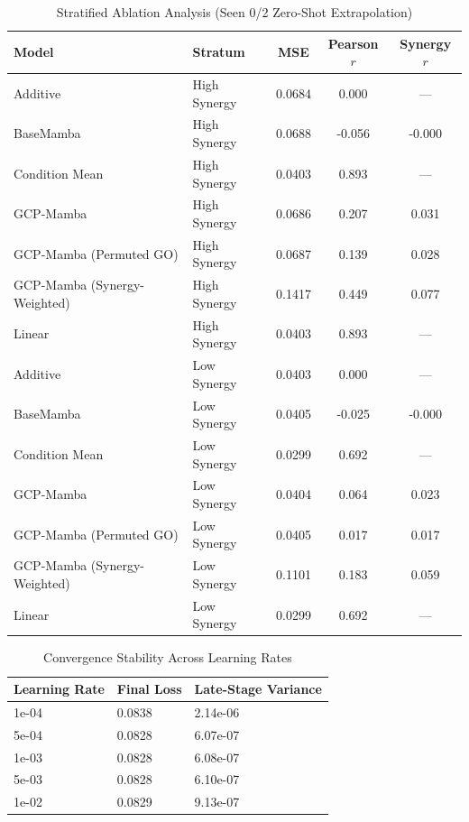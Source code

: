 \documentclass{bioinfo}
\begin{document}
\begin{table}[!htbp]
\centering
\caption{Stratified Ablation Analysis (Seen 0/2 Zero-Shot Extrapolation)}
\label{tab:ablation}
\begin{tabular}{llccc}
\toprule
\textbf{Model} & \textbf{Stratum} & \textbf{MSE} & \textbf{Pearson $r$} & \textbf{Synergy $r$} \\
\midrule
Additive & High Synergy & 0.0684 & 0.000 & --- \\
BaseMamba & High Synergy & 0.0688 & -0.056 & -0.000 \\
Condition Mean & High Synergy & 0.0403 & 0.893 & --- \\
GCP-Mamba & High Synergy & 0.0686 & 0.207 & 0.031 \\
GCP-Mamba (Permuted GO) & High Synergy & 0.0687 & 0.139 & 0.028 \\
GCP-Mamba (Synergy-Weighted) & High Synergy & 0.1417 & 0.449 & 0.077 \\
Linear & High Synergy & 0.0403 & 0.893 & --- \\
Additive & Low Synergy & 0.0403 & 0.000 & --- \\
BaseMamba & Low Synergy & 0.0405 & -0.025 & -0.000 \\
Condition Mean & Low Synergy & 0.0299 & 0.692 & --- \\
GCP-Mamba & Low Synergy & 0.0404 & 0.064 & 0.023 \\
GCP-Mamba (Permuted GO) & Low Synergy & 0.0405 & 0.017 & 0.017 \\
GCP-Mamba (Synergy-Weighted) & Low Synergy & 0.1101 & 0.183 & 0.059 \\
Linear & Low Synergy & 0.0299 & 0.692 & --- \\
\bottomrule
\end{tabular}
\end{table}

\begin{table}[!htbp]
\centering
\caption{Convergence Stability Across Learning Rates}
\label{tab:convergence}
\begin{tabular}{lll}
\toprule
\textbf{Learning Rate} & \textbf{Final Loss} & \textbf{Late-Stage Variance} \\
\midrule
1e-04 & 0.0838 & 2.14e-06 \\
5e-04 & 0.0828 & 6.07e-07 \\
1e-03 & 0.0828 & 6.08e-07 \\
5e-03 & 0.0828 & 6.10e-07 \\
1e-02 & 0.0829 & 9.13e-07 \\
\bottomrule
\end{tabular}
\end{table}
\end{document}
